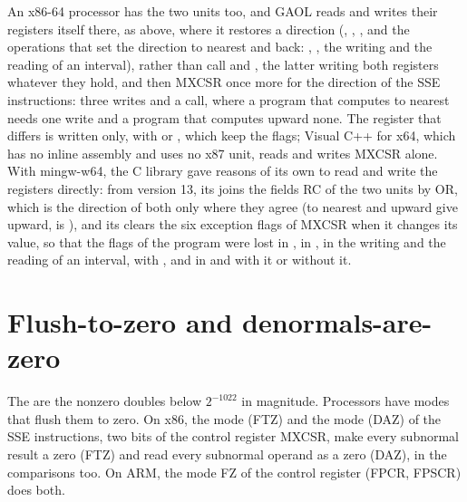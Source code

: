\medskip
An x86-64 processor has the two units too, and GAOL reads and writes their
registers itself there, as above, where it restores a direction
(, ,
, and the operations that set the direction to
nearest and back: , , the writing and the
reading of an interval), rather than call  and
,\newinvfive{} the latter writing both registers whatever
they hold, and then MXCSR once more for the direction of the SSE instructions:
three writes and a call, where a program that computes to nearest needs one
write and a program that computes upward none. The register that differs is
written only, with  or , which keep the flags;
Visual C++ for x64, which has no inline assembly and uses no x87 unit, reads
and writes MXCSR alone. With mingw-w64, the C library gave reasons of its own to read and write the
registers directly: from version 13, its  joins the
fields RC of the two units by OR, which is the direction of both only where
they agree (to nearest and upward give upward,
 is ), and its
 clears the six exception flags of MXCSR when it changes
its value, so that the flags of the program were lost in , in
, in the writing and the reading of an interval, with
, and in  and
 with it or without it.

\section{Flush-to-zero and denormals-are-zero}\label{sec:ftz}
%
%
%
%
%

\begin{Def}\label{def:ftz}
The  are the nonzero doubles below $2^{-1022}$ in magnitude.
Processors have modes that flush them to zero. On x86, the
 mode (FTZ) and the  mode (DAZ) of
the SSE instructions, two bits of the control register MXCSR, make every
subnormal result a zero (FTZ) and read every subnormal operand as a zero
(DAZ), in the comparisons too. On ARM, the mode FZ of the control register
(FPCR, FPSCR) does both.
\end{Def}

